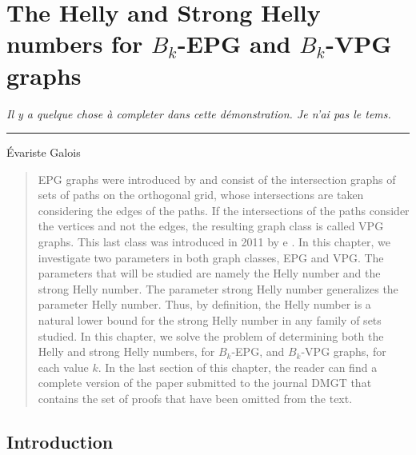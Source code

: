 \chapter{The Helly and Strong Helly numbers for  $B_k$-EPG and $B_k$-VPG graphs}
\label{cap:iv}

\vspace{0.5cm}
\begin{flushright}
\begin{minipage}[t][0cm][b]{0.47\textwidth}
\emph{
Il y a quelque chose à completer dans cette démonstration. Je n’ai pas le tems.}
\end{minipage}

\rule[0cm]{7cm}{0.03cm}%

Évariste Galois
\end{flushright}

\begin{quotation}
EPG graphs were introduced by \citet{golumbic2009} and consist of the intersection graphs of sets of paths on the orthogonal grid, whose intersections are taken considering the edges of the paths. If the intersections of the paths consider the vertices and not the edges, the resulting graph class is called VPG graphs. This last class was introduced in 2011 by \citet{asinowski2011string} e \citet{asinowski2012}.  In this chapter, we investigate two parameters in both graph classes, EPG and VPG. The parameters that will be studied are namely the Helly number and the strong Helly number. The parameter strong Helly number  generalizes the parameter Helly number. Thus, by definition, the Helly number is a natural lower bound for the strong Helly number in any family of sets studied. In this chapter, we solve the problem of determining both the Helly and strong Helly numbers, for $B_k$-EPG, and $B_k$-VPG graphs, for each value $k$. In the last section of this chapter, the reader can find a complete version of the paper submitted to  the journal DMGT that contains the set of proofs that have been omitted from the text.
\end{quotation}





\section{Introduction}

